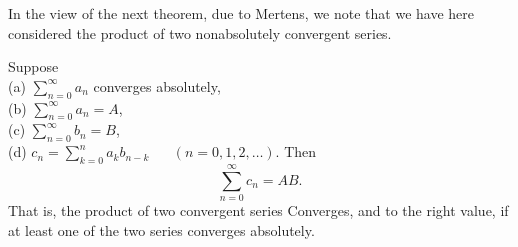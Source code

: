 In the view of the next theorem, due to Mertens, we note that we have here considered the product of two nonabsolutely convergent series.

\begin{thm}
    \label{thm:3.50}
    Suppose \\
    (a) $\sum_{n=0}^{\infty} a_n$ converges absolutely, \\
    (b) $\sum_{n=0}^{\infty} a_n = A$, \\
    (c) $\sum_{n=0}^{\infty} b_n = B$, \\
    (d) $c_n = \sum_{k=0}^{n} a_k b_{n-k}$ $\quad$ $(n = 0, 1, 2, \dots)$.
    Then
    \begin{equation*}
        \sum_{n=0}^{\infty} c_n = AB.
    \end{equation*}
    That is, the product of two convergent series Converges,
    and to the right value,
    if at least one of the two series converges absolutely.
\end{thm}

